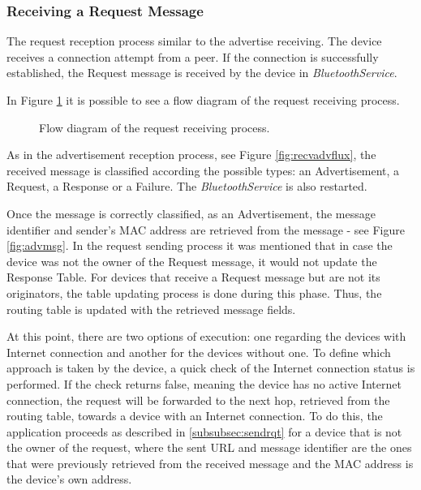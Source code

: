 \subsubsection{Receiving a Request Message}
\label{subsubsec:rcvrqt}

The request reception process similar to the advertise receiving. The device receives a connection attempt from a peer. If the connection is successfully established, the Request message is received by the device in \textit{BluetoothService}.

In Figure \ref{fig:rqtrcvflux} it is possible to see a flow diagram of the request receiving process.

\begin{figure}[ht]
	\noindent{}
	\caption{\label{fig:rqtrcvflux} Flow diagram of the request receiving process.}
\end{figure}

As in the advertisement reception process, see Figure \ref{fig:recvadvflux}, the received message is classified according the possible types: an Advertisement, a Request, a Response or a Failure. The \textit{BluetoothService} is also restarted.

Once the message is correctly classified, as an Advertisement, the message identifier and sender's \gls{MAC} address are retrieved from the message - see Figure \ref{fig:advmsg}. In the request sending process it was mentioned that in case the device was not the owner of the Request message, it would not update the Response Table. For devices that receive a Request message but are not its originators, the table updating process is done during this phase. Thus, the routing table is updated with the retrieved message fields.

At this point, there are two options of execution: one regarding the devices with Internet connection and another for the devices without one. To define which approach is taken by the device, a quick check of the Internet connection status is performed. If the check returns false, meaning the device has no active Internet connection, the request will be forwarded to the next hop, retrieved from the routing table, towards a device with an Internet connection. To do this, the application proceeds as described in \ref{subsubsec:sendrqt} for a device that is not the owner of the request, where the sent \gls{URL} and message identifier are the ones that were previously retrieved from the received message and the \gls{MAC} address is the device's own address.

